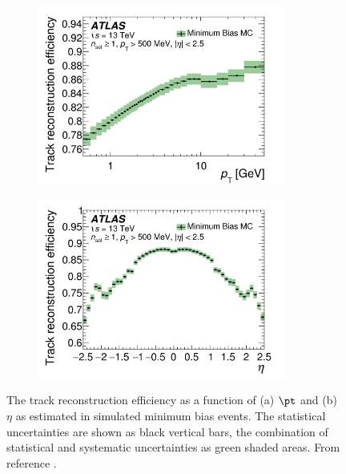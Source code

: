 \begin{figure}[h!]
\begin{subfigure}{0.5\textwidth}
  \centering
  \includegraphics[width=0.9\textwidth]{figures/Objects/efftrkpt.png}
  \caption{}
  \label{sec:obj:fig:efftrkpt}
\end{subfigure}
\begin{subfigure}{0.5\textwidth}
  \centering
  \includegraphics[width=0.9\textwidth]{figures/Objects/efftrketa.png}
  \caption{}
  \label{sec:obj:fig:efftrketa}
\end{subfigure}

\captionsetup{width=0.85\textwidth} \caption{\small The track reconstruction efficiency as a function of (a) $\pt$ and (b) $\eta$ as estimated in simulated minimum bias events. The statistical uncertainties are shown as black vertical bars, the combination of statistical and systematic uncertainties as green shaded areas. From reference \cite{Aad:2016mok}.}
\label{sec:obj:fig:efftrk}
\end{figure}




